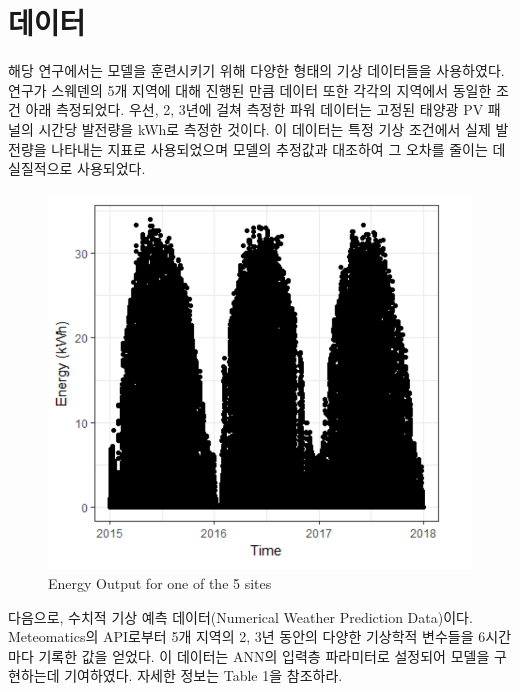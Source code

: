 \documentclass{article}
\begin{document}
\section{데이터}
해당 연구에서는 모델을 훈련시키기 위해 다양한 형태의 기상 데이터들을 사용하였다. 연구가 스웨덴의 5개 지역에 대해 진행된 만큼 데이터 또한 각각의 지역에서 동일한 조건 아래 측정되었다. 우선, 2, 3년에 걸쳐 측정한 파워 데이터는 고정된 태양광 PV 패널의 시간당 발전량을 kWh로 측정한 것이다. 이 데이터는 특정 기상 조건에서 실제 발전량을 나타내는 지표로 사용되었으며 모델의 추정값과 대조하여 그 오차를 줄이는 데 실질적으로 사용되었다.

\begin{figure}[!h]
\centering
\includegraphics[scale=0.20]{./fig/Figure_4.png}
\caption{Energy Output for one of the 5 sites}
\end{figure}

다음으로, 수치적 기상 예측 데이터(Numerical Weather Prediction Data)이다. Meteomatics의 API로부터 5개 지역의 2, 3년 동안의 다양한 기상학적 변수들을 6시간마다 기록한 값을 얻었다. 이 데이터는 ANN의 입력층 파라미터로 설정되어 모델을 구현하는데 기여하였다. 자세한 정보는 Table 1을 참조하라.
\end{document}
